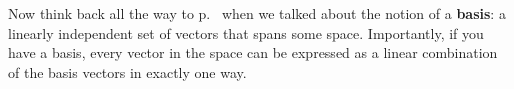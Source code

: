 Now think back all the way to p.~\pageref{basis} when we talked about the
notion of a \textbf{basis}: a linearly independent set of vectors that spans
some space. Importantly, if you have a basis, every vector in the space can be
expressed as a linear combination of the basis vectors in exactly one way.
%
%
%
%
%
%
%

